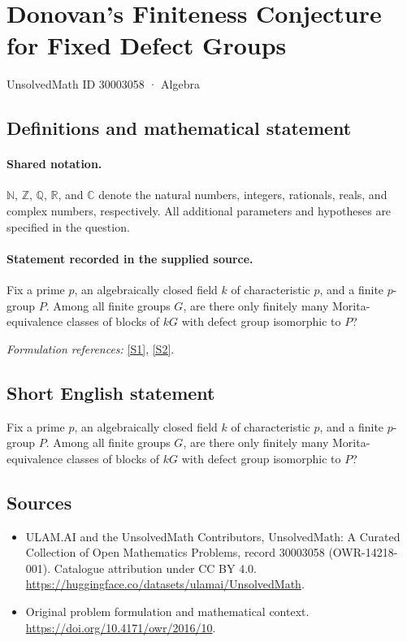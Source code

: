 \documentclass[11pt]{article}
\newcommand{\sref}[2]{\hyperlink{source:#1:#2}{[S#2]}}
\begin{document}
\setcounter{section}{30003057}
\section{Donovan’s Finiteness Conjecture for Fixed Defect Groups}\label{30003058}
{\small UnsolvedMath ID 30003058 · Algebra}
\subsection{Definitions and mathematical statement}

\paragraph{Shared notation.}$\mathbb N$, $\mathbb Z$, $\mathbb Q$, $\mathbb R$, and $\mathbb C$ denote the natural numbers, integers, rationals, reals, and complex numbers, respectively. All additional parameters and hypotheses are specified in the question.


\paragraph{Statement recorded in the supplied source.}
Fix a prime $p$, an algebraically closed field $k$ of characteristic $p$, and a finite $p$-group $P$. Among all finite groups $G$, are there only finitely many Morita-equivalence classes of blocks of $kG$ with defect group isomorphic to $P$?
\par\smallskip\textit{Formulation references:} \sref{30003058}{1}, \sref{30003058}{2}.
\subsection{Short English statement}
Fix a prime $p$, an algebraically closed field $k$ of characteristic $p$, and a finite $p$-group $P$. Among all finite groups $G$, are there only finitely many Morita-equivalence classes of blocks of $kG$ with defect group isomorphic to $P$?
\subsection{Sources}
\begin{itemize}
\item[\hypertarget{source:30003058:1}{S1}] ULAM.AI and the UnsolvedMath Contributors, UnsolvedMath: A Curated Collection of Open Mathematics Problems, record 30003058 (OWR-14218-001). Catalogue attribution under CC BY 4.0.
\url{https://huggingface.co/datasets/ulamai/UnsolvedMath}.
\item[\hypertarget{source:30003058:2}{S2}] Original problem formulation and mathematical context.
\url{https://doi.org/10.4171/owr/2016/10}.
\end{itemize}
\label{end:30003058}
\end{document}
